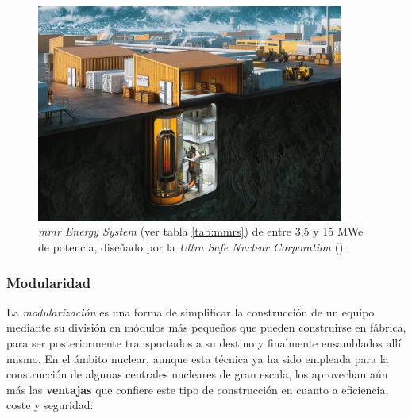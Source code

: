 \begin{figure}[h]
  \centering
  \includegraphics[width=0.9\textwidth]{content/figures/ultra_safe_nuclear_mmr.jpg}
  \caption{\emph{\acrshort{mmr} Energy System} (ver tabla \ref{tab:mmrs}) de entre 3,5 y 15 MWe de potencia, diseñado por la \emph{Ultra Safe Nuclear Corporation} (\cite{ultra_safe_nuclear_corporation}).}
  \label{fig:ultra_safe_nuclear_mmr}
\end{figure}

\subsubsection{Modularidad} \label{modularidad}

La \emph{modularización} es una forma de simplificar la construcción de un equipo mediante su división en módulos más pequeños que pueden construirse en fábrica, para ser posteriormente transportados a su destino y finalmente ensamblados allí mismo. En el ámbito nuclear, aunque esta técnica ya ha sido empleada para la construcción de algunas centrales nucleares de gran escala, los  aprovechan aún más las \textbf{ventajas} que confiere este tipo de construcción en cuanto a eficiencia, coste y seguridad:

